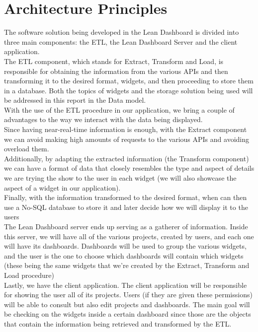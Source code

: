 \documentclass[a4paper,twoside,10pt]{report}
\begin{document}
\section{Architecture Principles}
The software solution being developed in the Lean Dashboard is divided into three main components: the ETL\cite{ETLPROC}, the Lean Dashboard Server and the client application.
\\ \newline
The ETL component, which stands for Extract, Transform and Load,  is responsible for obtaining the information from the various APIs and then transforming it to the desired format, widgets, and then proceeding to store them in a database. Both the topics of widgets and the storage solution being used will be addressed in this report in the Data model.
\\ \newline
With the use of the ETL procedure in our application, we bring a couple of advantages to the way we interact with the data being displayed.
\\ \newline
Since having near-real-time information is enough, with the Extract component we can avoid making high amounts of requests to the various APIs and avoiding overload them.
\\ \newline
Additionally, by adapting the extracted information (the Transform component) we can have a format of data that closely resembles the type and aspect of details we are trying the show to the user in each widget (we will also showcase the aspect of a widget in our application).
\\ \newline
Finally, with the information transformed to the desired format, when can then use a No-SQL database to store it and later decide how we will display it to the users 
\\ \newline
The Lean Dashboard server ends up serving as a gatherer of information. Inside this server, we will have all of the various projects, created by users, and each one will have its dashboards. Dashboards will be used to group the various widgets, and the user is the one to choose which dashboards will contain which widgets (these being the same widgets that we're created by the Extract, Transform and Load procedure)
\\ \newline
Lastly, we have the client application. The client application will be responsible for showing the user all of its projects. Users (if they are given these permissions) will be able to consult but also edit projects and dashboards. The main goal will be checking on the widgets inside a certain dashboard since those are the objects that contain the information being retrieved and transformed by the ETL.
\end{document}
